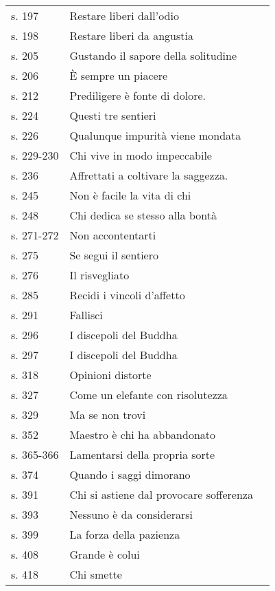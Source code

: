 {\begin{longtable}[c]{llr}
s. 197 & Restare liberi dall'odio & \pageref{dhp-197}\\
s. 198 & Restare liberi da angustia & \pageref{dhp-198}\\
s. 205 & Gustando il sapore della solitudine & \pageref{dhp-205}\\
s. 206 & È sempre un piacere & \pageref{dhp-206}\\
s. 212 & Prediligere è fonte di dolore. & \pageref{dhp-212}\\
s. 224 & Questi tre sentieri & \pageref{dhp-224}\\
s. 226 & Qualunque impurità viene mondata & \pageref{dhp-226}\\
s. 229-230 & Chi vive in modo impeccabile & \pageref{dhp-229}\\
s. 236 & Affrettati a coltivare la saggezza. & \pageref{dhp-236}\\
s. 245 & Non è facile la vita di chi & \pageref{dhp-245}\\
s. 248 & Chi dedica se stesso alla bontà & \pageref{dhp-248}\\
s. 271-272 & Non accontentarti & \pageref{dhp-271}\\
s. 275 & Se segui il sentiero & \pageref{dhp-275}\\
s. 276 & Il risvegliato & \pageref{dhp-276}\\
s. 285 & Recidi i vincoli d'affetto & \pageref{dhp-285}\\
s. 291 & Fallisci & \pageref{dhp-291}\\
s. 296 & I discepoli del Buddha & \pageref{dhp-296}\\
s. 297 & I discepoli del Buddha & \pageref{dhp-297}\\
s. 318 & Opinioni distorte & \pageref{dhp-318}\\
s. 327 & Come un elefante con risolutezza & \pageref{dhp-327}\\
s. 329 & Ma se non trovi & \pageref{dhp-329}\\
s. 352 & Maestro è chi ha abbandonato & \pageref{dhp-352}\\
s. 365-366 & Lamentarsi della propria sorte & \pageref{dhp-365}\\
s. 374 & Quando i saggi dimorano & \pageref{dhp-374}\\
s. 391 & Chi si astiene dal provocare sofferenza & \pageref{dhp-391}\\
s. 393 & Nessuno è da considerarsi & \pageref{dhp-393}\\
s. 399 & La forza della pazienza & \pageref{dhp-399}\\
s. 408 & Grande è colui & \pageref{dhp-408}\\
s. 418 & Chi smette & \pageref{dhp-418}\\
\end{longtable}

}

